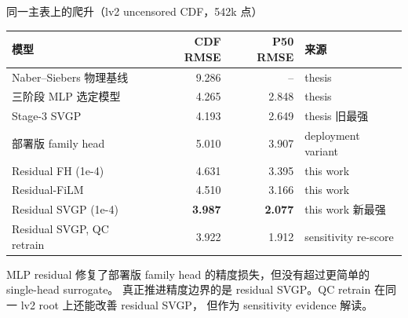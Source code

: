 \documentclass[UTF8,aspectratio=169]{ctexbeamer}
\begin{document}
\begin{frame}{同一主表上的爬升（lv2 uncensored CDF，542k 点）}
\small
\begin{center}
\renewcommand{\arraystretch}{1.18}
\setlength{\tabcolsep}{5pt}
\begin{tabular}{@{}lrrl@{}}
\toprule
\textbf{模型} & \textbf{CDF RMSE} & \textbf{P50 RMSE} & \textbf{来源} \\
\midrule
Naber--Siebers 物理基线 & 9.286 & -- & thesis \\
三阶段 MLP 选定模型 & 4.265 & 2.848 & thesis \\
Stage-3 SVGP & 4.193 & 2.649 & thesis 旧最强 \\
\midrule
部署版 family head & 5.010 & 3.907 & deployment variant \\
Residual FH (1e-4) & 4.631 & 3.395 & this work \\
Residual-FiLM & 4.510 & 3.166 & this work \\
\rowcolor{winrow}
Residual SVGP (1e-4) & \textbf{3.987} & \textbf{2.077} & this work 新最强 \\
Residual SVGP, QC retrain & 3.922 & 1.912 & sensitivity re-score \\
\bottomrule
\end{tabular}
\end{center}
\vspace{0.25em}
\footnotesize
MLP residual 修复了部署版 family head 的精度损失，但没有超过更简单的 single-head surrogate。
真正推进精度边界的是 residual SVGP。QC retrain 在同一 lv2 root 上还能改善 residual SVGP，
但作为 sensitivity evidence 解读。
\end{frame}
\end{document}
